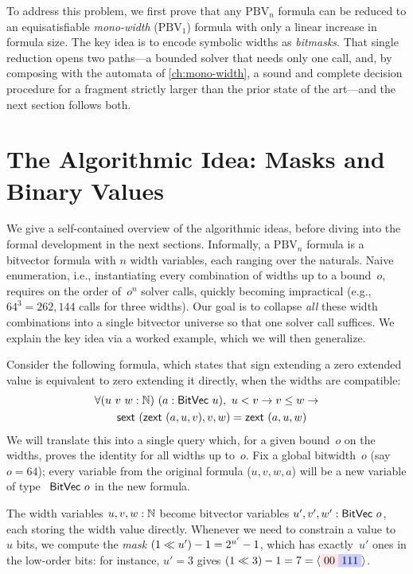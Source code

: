 To address this problem, we first prove that any $\text{PBV}_n$ formula can be
reduced to an equisatisfiable \emph{mono-width} ($\text{PBV}_1$) formula with
only a linear increase in formula size. The key idea is to encode symbolic
widths as \emph{bitmasks}. That single reduction opens two paths---a bounded
solver that needs only one \qfbv{} call, and, by composing with the automata of
\cref{ch:mono-width}, a sound and complete decision procedure for a fragment
strictly larger than the prior state of the art---and the next section follows
both.

\section{The Algorithmic Idea: Masks and Binary Values}
\label{sec:mwbv:idea}

We give a self-contained overview of the algorithmic ideas, before diving into
the formal development in the next sections.
%
Informally, a $\text{PBV}_n$ formula is a bitvector formula with $n$ width
variables, each ranging over the naturals. Naive enumeration, i.e.,
instantiating every combination of widths up to a bound~$o$, requires on the
order of~$o^n$ solver calls, quickly becoming impractical (e.g., $64^3 =
262{,}144$ calls for three widths). Our goal is to collapse \emph{all} these
width combinations into a single bitvector universe so that one solver call
suffices. We explain the key idea via a worked example, which we will then
generalize.

Consider the following formula, which states that sign extending a
zero extended value is equivalent to zero extending it directly, when
the widths are compatible:
\[
\begin{aligned}
  &\forall (u~v~w : \mathbb N)~(a : \mathsf{BitVec}~{u}),~ u < v \to v \leq w \to\\
  &\qquad \mathsf{sext}~(\mathsf{zext}~(a, u, v), v, w) = \mathsf{zext}~(a, u, w)
\end{aligned}
\]
We will translate this into a single \qfbv{} query which, for a given bound~$o$
on the widths, proves the identity for all widths up to~$o$.
%
Fix a global bitwidth~$o$ (say $o = 64$); every variable from the original
formula ($u, v, w, a$) will be a new variable of type ~$\mathsf{BitVec}~{o}$ in the new
formula.

The width variables $u, v, w : \mathbb N$ become bitvector variables
$u', v', w' : \mathsf{BitVec}~{o}$, each storing the width value directly.
Whenever we need to constrain a value to~$u$ bits, we compute the
\emph{mask} $(1 \ll u') - 1 = 2^{u'} - 1$, which has exactly~$u'$
ones in the low-order bits: for instance, $u' = 3$ gives
$(1 \bitshl 3) - 1 = 7 = \langle\redbox{00}\bluebox{111}\rangle$.

